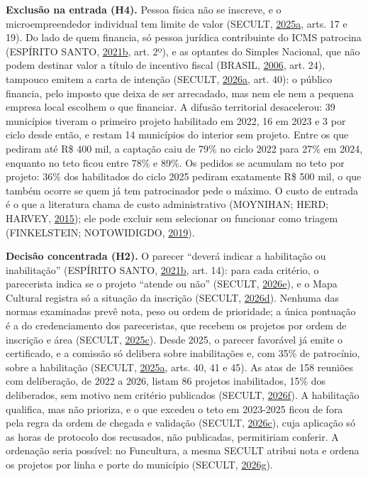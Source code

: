 \documentclass[12pt,a4paper]{article}
\begin{document}
\textbf{Exclusão na entrada (H4).} Pessoa física não se inscreve, e o microempreendedor individual
tem limite de valor (SECULT, \hyperref[ref-secult-35]{2025a}, arts. 17 e 19). Do lado de quem
financia, só pessoa jurídica contribuinte do ICMS patrocina (ESPÍRITO SANTO,
\hyperref[ref-espirito-13]{2021b}, art. 2º), e as optantes do Simples Nacional, que não podem
destinar valor a título de incentivo fiscal (BRASIL, \hyperref[ref-brasil-4]{2006}, art. 24),
tampouco emitem a carta de intenção (SECULT, \hyperref[ref-secult-38]{2026a}, art. 40): o público
financia, pelo imposto que deixa de ser arrecadado, mas nem ele nem a pequena empresa local escolhem
o que financiar. A difusão territorial desacelerou: 39 municípios tiveram o primeiro projeto
habilitado em 2022, 16 em 2023 e 3 por ciclo desde então, e restam 14 municípios do interior sem
projeto. Entre os que pediram até R\$ 400 mil, a captação caiu de 79\% no ciclo 2022 para 27\% em
2024, enquanto no teto ficou entre 78\% e 89\%. Os pedidos se acumulam no teto por projeto: 36\% dos
habilitados do ciclo 2025 pediram exatamente R\$ 500 mil, o que também ocorre se quem já tem
patrocinador pede o máximo. O custo de entrada é o que a literatura chama de custo administrativo
(MOYNIHAN; HERD; HARVEY, \hyperref[ref-moynihan-26]{2015}); ele pode excluir sem selecionar ou
funcionar como triagem (FINKELSTEIN; NOTOWIDIGDO, \hyperref[ref-finkelstein-17]{2019}).

\textbf{Decisão concentrada (H2).} O parecer ``deverá indicar a habilitação ou inabilitação''
(ESPÍRITO SANTO, \hyperref[ref-espirito-13]{2021b}, art. 14): para cada critério, o parecerista
indica se o projeto ``atende ou não'' (SECULT, \hyperref[ref-secult-41]{2026e}), e o Mapa Cultural
registra só a situação da inscrição (SECULT, \hyperref[ref-secult-40]{2026d}). Nenhuma das normas
examinadas prevê nota, peso ou ordem de prioridade; a única pontuação é a do credenciamento dos
pareceristas, que recebem os projetos por ordem de inscrição e área (SECULT,
\hyperref[ref-secult-37]{2025c}). Desde 2025, o parecer favorável já emite o certificado, e a
comissão só delibera sobre inabilitações e, com 35\% de patrocínio, sobre a habilitação (SECULT,
\hyperref[ref-secult-35]{2025a}, arts. 40, 41 e 45). As atas de 158 reuniões com deliberação, de
2022 a 2026, listam 86 projetos inabilitados, 15\% dos deliberados, sem motivo nem critério
publicados (SECULT, \hyperref[ref-secult-43]{2026f}). A habilitação qualifica, mas não prioriza, e o
que excedeu o teto em 2023-2025 ficou de fora pela regra da ordem de chegada e validação (SECULT,
\hyperref[ref-secult-39]{2026c}), cuja aplicação só as horas de protocolo dos recusados, não
publicadas, permitiriam conferir. A ordenação seria possível: no Funcultura, a mesma SECULT atribui
nota e ordena os projetos por linha e porte do município (SECULT, \hyperref[ref-secult-44]{2026g}).
\end{document}
